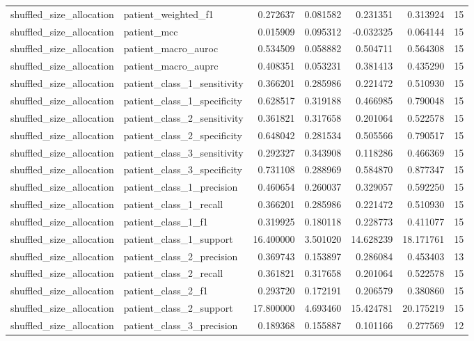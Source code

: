 \begin{tabular}{llrrrrr}
shuffled_size_allocation & patient_weighted_f1 & 0.272637 & 0.081582 & 0.231351 & 0.313924 & 15 \\
shuffled_size_allocation & patient_mcc & 0.015909 & 0.095312 & -0.032325 & 0.064144 & 15 \\
shuffled_size_allocation & patient_macro_auroc & 0.534509 & 0.058882 & 0.504711 & 0.564308 & 15 \\
shuffled_size_allocation & patient_macro_auprc & 0.408351 & 0.053231 & 0.381413 & 0.435290 & 15 \\
shuffled_size_allocation & patient_class_1_sensitivity & 0.366201 & 0.285986 & 0.221472 & 0.510930 & 15 \\
shuffled_size_allocation & patient_class_1_specificity & 0.628517 & 0.319188 & 0.466985 & 0.790048 & 15 \\
shuffled_size_allocation & patient_class_2_sensitivity & 0.361821 & 0.317658 & 0.201064 & 0.522578 & 15 \\
shuffled_size_allocation & patient_class_2_specificity & 0.648042 & 0.281534 & 0.505566 & 0.790517 & 15 \\
shuffled_size_allocation & patient_class_3_sensitivity & 0.292327 & 0.343908 & 0.118286 & 0.466369 & 15 \\
shuffled_size_allocation & patient_class_3_specificity & 0.731108 & 0.288969 & 0.584870 & 0.877347 & 15 \\
shuffled_size_allocation & patient_class_1_precision & 0.460654 & 0.260037 & 0.329057 & 0.592250 & 15 \\
shuffled_size_allocation & patient_class_1_recall & 0.366201 & 0.285986 & 0.221472 & 0.510930 & 15 \\
shuffled_size_allocation & patient_class_1_f1 & 0.319925 & 0.180118 & 0.228773 & 0.411077 & 15 \\
shuffled_size_allocation & patient_class_1_support & 16.400000 & 3.501020 & 14.628239 & 18.171761 & 15 \\
shuffled_size_allocation & patient_class_2_precision & 0.369743 & 0.153897 & 0.286084 & 0.453403 & 13 \\
shuffled_size_allocation & patient_class_2_recall & 0.361821 & 0.317658 & 0.201064 & 0.522578 & 15 \\
shuffled_size_allocation & patient_class_2_f1 & 0.293720 & 0.172191 & 0.206579 & 0.380860 & 15 \\
shuffled_size_allocation & patient_class_2_support & 17.800000 & 4.693460 & 15.424781 & 20.175219 & 15 \\
shuffled_size_allocation & patient_class_3_precision & 0.189368 & 0.155887 & 0.101166 & 0.277569 & 12 \\

\end{tabular}
